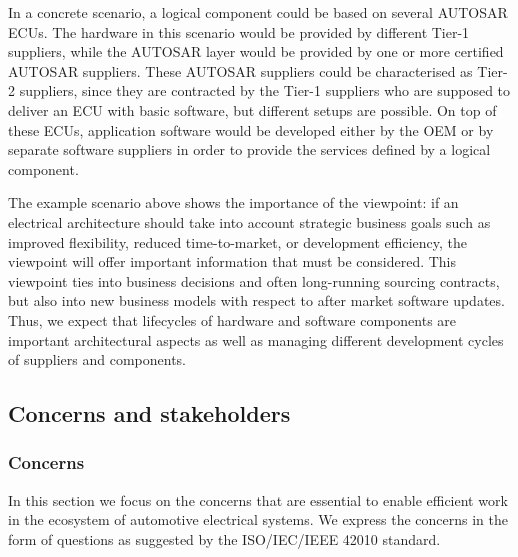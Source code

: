 In a concrete scenario, a logical component could be based on several AUTOSAR ECUs.
The hardware in this scenario would be provided by different Tier-1 suppliers, while the AUTOSAR layer would be provided by one or more certified AUTOSAR suppliers.
These AUTOSAR suppliers could be characterised as Tier-2 suppliers, since they are contracted by the Tier-1 suppliers who are supposed to deliver an ECU with basic software, but different setups are possible. 
On top of these ECUs, application software would be developed either by the OEM or by separate software suppliers in order to provide the services defined by a logical component. 

The example scenario above shows the importance of the  viewpoint: if an electrical architecture should take into account strategic business goals such as improved flexibility, reduced time-to-market, or development efficiency, the  viewpoint will offer important information that must be considered.
This viewpoint ties into business decisions and often long-running sourcing contracts, but also into new business models with respect to after market software updates.
Thus, we expect that lifecycles of hardware and software components are important architectural aspects as well as managing different development cycles of suppliers and components.


\subsection{Concerns and stakeholders} 


\subsubsection{Concerns}\label{vp:concerns}
In this section we focus on the concerns that are essential to enable efficient work in the ecosystem of automotive electrical systems. 
We express the concerns in the form of questions as suggested by the ISO/IEC/IEEE 42010 standard.

